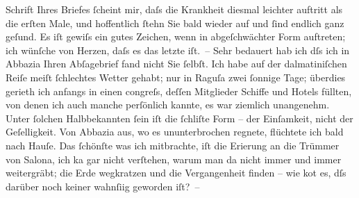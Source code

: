                Schrift Ihres Briefes{ }ſcheint mir, daſs die Krankheit diesmal leichter auftritt als
               die erſten Male, und hoffentlich{ }ſtehn Sie bald wieder auf und{ }ſind endlich ganz
               geſund. Es iſt gewiſs ein gutes Zeichen, wenn \label{K_L01034-2v}\label{K_L01034-2} in abgeſchwächter Form auftreten; {\pb}ich wünſche von Herzen, daſs es das letzte iſt. –
               Sehr bedauert hab ich dſs ich in Abbazia Ihren
               Abſagebrief fand nicht Sie{ }ſelbſt. Ich habe auf der dalmatiniſchen Reiſe meiſt{ }ſchlechtes Wetter gehabt; nur in Raguſa zwei{ }ſonnige Tage; überdies gerieth ich
               anfangs in einen \label{K_L01034-3v}\label{K_L01034-3}congreſs, deſſen Mitglieder Schiffe und Hotels füllten, von
               denen ich auch manche perſönlich kannte, es war ziemlich unangenehm. Unter{ }ſolchen
                  Halb{\pb}bekannten{ }ſein iſt die{ }ſchli{\geminationm}ſte Form – der Einſamkeit, nicht der Geſelligkeit. Von
                  Abbazia aus, wo es ununterbrochen regnete,
               flüchtete ich bald nach Hauſe. Das{ }ſchönſte was ich mitbrachte, iſt die Eri{\geminationn}erung an die Trümmer von Salona, ich ka{\geminationn} gar nicht verſtehen, warum man
               da nicht immer und immer weitergräbt; die Erde wegkratzen und die Vergangenheit
               finden – wie ko{\geminationm}t es, dſs darüber noch keiner wahnſi{\geminationn}ig {\pb}geworden
               iſt? –\pend
           
